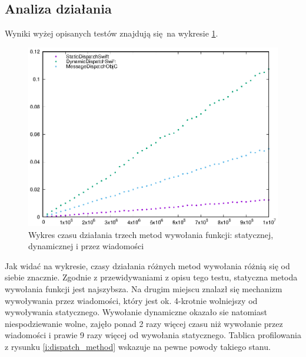 \documentclass[mgr, shortabstract]{iithesis}
\begin{document}
\subsection{Analiza działania}

Wyniki wyżej opisanych testów znajdują się na wykresie \ref{p:dispatch_method}.

\begin{figure}
    \includegraphics{plots/Dispatch.eps}
    \caption{Wykres czasu działania trzech metod wywołania funkcji: statycznej, dynamicznej i przez wiadomości}
    \label{p:dispatch_method}
\end{figure}

Jak widać na wykresie, czasy działania różnych metod wywołania różnią się od siebie znacznie. Zgodnie z przewidywaniami z opisu tego testu, statyczna metoda wywołania funkcji jest najszybsza. Na drugim miejscu znalazł się mechanizm wywoływania przez wiadomości, który jest ok. 4-krotnie wolniejszy od wywoływania statycznego. Wywołanie dynamiczne okazało sie natomiast niespodziewanie wolne, zajęło ponad 2 razy więcej czasu niż wywołanie przez wiadomości i prawie 9 razy więcej od wywołania statycznego. Tablica profilowania z rysunku \ref{i:dispatch_method} wskazuje na pewne powody takiego stanu.
\end{document}
